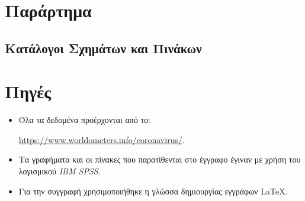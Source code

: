 \documentclass{article}
\begin{document}
\section{Παράρτημα}

\subsection{Κατάλογοι Σχημάτων και Πινάκων}

\listoffigures
\listoftables

\newpage

\section{Πηγές}

\begin{itemize}
    \item Όλα τα δεδομένα προέρχονται από το:
    
    \href{https://www.worldometers.info/coronavirus/}{\foreignlanguage{english}{https://www.worldometers.info/coronavirus/}}.
    \item Τα γραφήματα και οι πίνακες που παρατίθενται στο έγγραφο έγιναν με χρήση του λογισμικού \foreignlanguage{english}{\emph{IBM SPSS}}. 
    \item Για την συγγραφή χρησιμοποιήθηκε η γλώσσα δημιουργίας εγγράφων \LaTeX.
\end{itemize}
\end{document}
